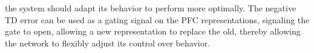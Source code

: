 the system should adapt its behavior to perform more optimally.  The negative TD error can be used as a gating signal on the PFC representations, signaling the gate to open, allowing a new representation to replace the old, thereby allowing the network to flexibly adjust its control over behavior.
%

